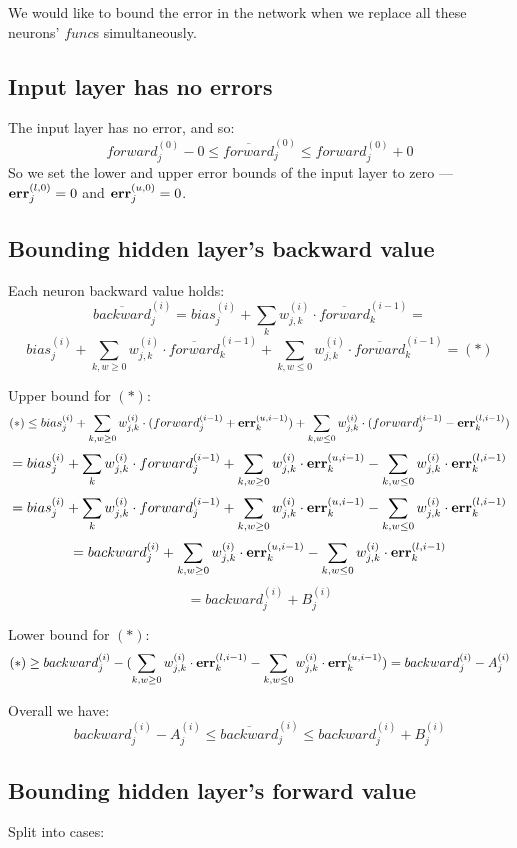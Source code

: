 \documentclass[10pt, conference, twocolumn, compsocconf]{IEEEtran}
\theoremstyle{remark}
\begin{document}
\begin{appendices}
We would like to bound the error in the network when we replace all these neurons' $func$s simultaneously.

\subsection{Input layer has no errors}
\noindent
The input layer has no error, and so:
\[ forward_j^{(0)} - 0 \leq \overline{forward}_j^{(0)} \leq forward_j^{(0)} + 0 \]
So we set the lower and upper error bounds of the input layer to zero --- ${\bf err}_j^{(l,0)} = 0$ and ${\bf err}_j^{(u,0)} = 0$.

\subsection{Bounding hidden layer's backward value}
\noindent
Each neuron backward value holds:
\[ \overline{backward}_j^{(i)} = bias_j^{(i)} + \sum_k w_{j,k}^{(i)} \cdot \overline{forward}^{(i-1)}_{k} = \]
\[ bias_j^{(i)} + \sum_{k,w \geq 0} w_{j,k}^{(i)} \cdot \overline{forward}^{(i-1)}_{k} + \sum_{k,w \leq 0} w_{j,k}^{(i)} \cdot \overline{forward}^{(i-1)}_{k} = (*) \]

\noindent
Upper bound for $(*)$:
\[ (*) \leq bias_j^{(i)} + \sum_{k,w \geq 0} w_{j,k}^{(i)} \cdot (forward^{(i-1)}_{j} + {\bf err}_k^{(u,i-1)}) + \sum_{k,w \leq 0} w_{j,k}^{(i)} \cdot (forward^{(i-1)}_{j} - {\bf err}_k^{(l,i-1)}) \]
\[ = bias_j^{(i)} + \sum_k w_{j,k}^{(i)} \cdot forward^{(i-1)}_{j} + \sum_{k,w \geq 0} w_{j,k}^{(i)} \cdot {\bf err}_k^{(u,i-1)} - \sum_{k,w \leq 0} w_{j,k}^{(i)} \cdot {\bf err}_k^{(l,i-1)} \]
\[ = bias_j^{(i)} + \sum_k w_{j,k}^{(i)} \cdot forward^{(i-1)}_{j} + \sum_{k,w \geq 0} w_{j,k}^{(i)} \cdot {\bf err}_k^{(u,i-1)} - \sum_{k,w \leq 0} w_{j,k}^{(i)} \cdot {\bf err}_k^{(l,i-1)} \]
\[ = backward^{(i)}_{j} + \sum_{k,w \geq 0} w_{j,k}^{(i)} \cdot {\bf err}_k^{(u,i-1)} - \sum_{k,w \leq 0} w_{j,k}^{(i)} \cdot {\bf err}_k^{(l,i-1)} \]
\[ = backward^{(i)}_{j} + B^{(i)}_{j} \]

\noindent
Lower bound for $(*)$:
\[ (*) \geq backward^{(i)}_{j} - ( \sum_{k,w \geq 0} w_{j,k}^{(i)} \cdot {\bf err}_k^{(l,i-1)} - \sum_{k,w \leq 0} w_{j,k}^{(i)} \cdot {\bf err}_k^{(u,i-1)} ) = backward^{(i)}_{j} - A^{(i)}_{j} \]

\noindent
Overall we have:
\[ backward^{(i)}_{j} - A^{(i)}_{j} \leq \overline{backward}_j^{(i)} \leq backward^{(i)}_{j} + B^{(i)}_{j} \]

\subsection{Bounding hidden layer's forward value}
\noindent
Split into cases:


\end{appendices}
\end{document}
